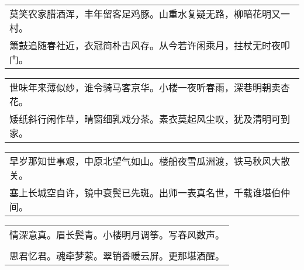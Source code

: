 \nopagebreak%
\nopagebreak%
\noindent\begin{minipage}{\linewidth}
  \vskip-3pt\begin{table}[H]
    \centering
    \begin{tabular}{@{}l@{}}
莫笑农家腊酒浑，丰年留客足鸡豚。山重水复疑无路，柳暗花明又一村。\\
箫鼓追随春社近，衣冠简朴古风存。从今若许闲乘月，拄杖无时夜叩门。
    \end{tabular}
  \end{table}
\end{minipage}
\vspace{1cm}


\nopagebreak%
\nopagebreak%
\noindent\begin{minipage}{\linewidth}
  \vskip-3pt\begin{table}[H]
    \centering
    \begin{tabular}{@{}l@{}}
世味年来薄似纱，谁令骑马客京华。小楼一夜听春雨，深巷明朝卖杏花。\\
矮纸斜行闲作草，晴窗细乳戏分茶。素衣莫起风尘叹，犹及清明可到家。
    \end{tabular}
  \end{table}
\end{minipage}
\vspace{1cm}


\nopagebreak%
\nopagebreak%
\noindent\begin{minipage}{\linewidth}
  \vskip-3pt\begin{table}[H]
    \centering
    \begin{tabular}{@{}l@{}}
早岁那知世事艰，中原北望气如山。楼船夜雪瓜洲渡，铁马秋风大散关。\\
塞上长城空自许，镜中衰鬓已先斑。出师一表真名世，千载谁堪伯仲间。
    \end{tabular}
  \end{table}
\end{minipage}
\vspace{1cm}


\nopagebreak%
\nopagebreak%
\noindent\begin{minipage}{\linewidth}
  \vskip-3pt\begin{table}[H]
    \centering
    \begin{tabular}{@{}l@{}}
情深意真。眉长鬓青。小楼明月调筝。写春风数声。\\
\\
思君忆君。魂牵梦萦。翠销香暖云屏。更那堪酒醒。
    \end{tabular}
  \end{table}
\end{minipage}
\vspace{1cm}


